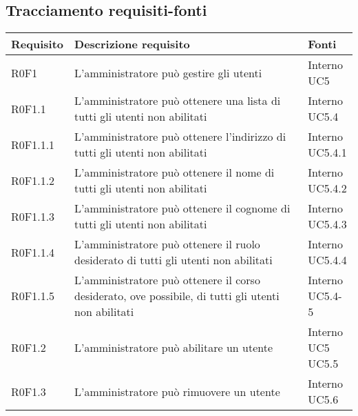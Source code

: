 \documentclass[AnalisiDeiRequisiti.tex]{subfiles}
\begin{document}
\newpage
\subsection{Tracciamento requisiti-fonti}

\label{table:Tabella di tracciamento requisiti-fonti}
\renewcommand*{\arraystretch}{1.2}
\begin{longtable}[H]{p{2cm}p{5.2cm}p{5cm}}
	\rowcolor{CHeader} 
	\color{CHeaderText} \textbf{Requisito} & \color{CHeaderText} \textbf{Descrizione requisito} & \color{CHeaderText} \textbf{Fonti} \\
	\endhead
	R0F1 & L'amministratore può gestire gli utenti & \makecell[tl]{
		Interno \\
		UC5
	} \\
	R0F1.1 & L'amministratore può ottenere una lista di tutti gli utenti non abilitati & \makecell[tl]{
		Interno \\
		UC5.4
	} \\
	R0F1.1.1 & L'amministratore può ottenere l'indirizzo di tutti gli utenti non abilitati & \makecell[tl]{
		Interno \\
		UC5.4.1
	} \\
	R0F1.1.2 & L'amministratore può ottenere il nome di tutti gli utenti non abilitati & \makecell[tl]{
		Interno \\
		UC5.4.2
	} \\
	R0F1.1.3 & L'amministratore può ottenere il cognome di tutti gli utenti non abilitati & \makecell[tl]{
		Interno \\
		UC5.4.3
	} \\
	R0F1.1.4 & L'amministratore può ottenere il ruolo desiderato di tutti gli utenti non abilitati & \makecell[tl]{
		Interno \\
		UC5.4.4
	} \\
	R0F1.1.5 & L'amministratore può ottenere il corso desiderato, ove possibile, di tutti gli utenti non abilitati & \makecell[tl]{
		Interno \\
		UC5.4-5
	} \\

	R0F1.2 & L'amministratore può abilitare un utente & \makecell[tl]{
		Interno \\ 
		UC5 \\ 
		UC5.5
	} \\
	R0F1.3 & L'amministratore può rimuovere un utente & \makecell[tl]{
		Interno \\ 
		UC5.6
	} \\


\end{longtable}
\end{document}
